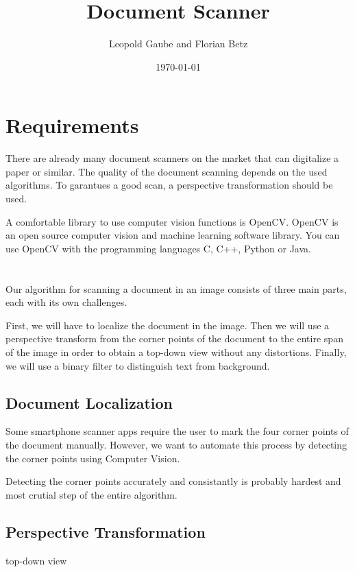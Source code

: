 \documentclass[bibliography=totoc]{scrartcl}
\title{Document Scanner}
\author{Leopold Gaube and Florian Betz}
\date{\today}
\begin{document}
	\maketitle
	\tableofcontents

	\clearpage

	\section{Requirements}

		There are already many document scanners on the market that can digitalize a paper or similar. 
		The quality of the document scanning depends on the used algorithms.
		To garantues a good scan, a perspective transformation should be used.
		
	    A comfortable library to use computer vision functions is \ac{OpenCV}.
	    \ac{OpenCV} is an open source computer vision and machine learning software library. \cite{OpenCV}
	    You can use OpenCV with the programming languages C, C++, Python or Java.
	    
	    

    \section{}
	Our algorithm for scanning a document in an image consists of three main parts, each with its own challenges.
	
	First, we will have to localize the document in the image. 
	Then we will use a perspective transform from the corner points of the document to the entire span of the image in order to obtain a top-down view without any distortions.
	Finally, we will use a binary filter to distinguish text from background.
		\subsection{Document Localization}
		Some smartphone scanner apps require the user to mark the four corner points of the document manually. 
		However, we want to automate this process by detecting the corner points using Computer Vision.

		Detecting the corner points accurately and consistantly is probably hardest and most crutial step of the entire algorithm.
		
		\subsection{Perspective Transformation}
		top-down view
\end{document}
